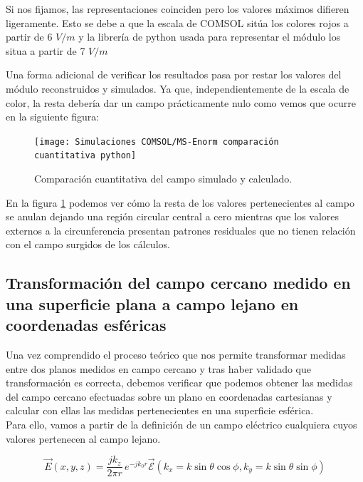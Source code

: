 \documentclass{article}
\begin{document}
Si nos fijamos, las representaciones coinciden pero los valores máximos difieren ligeramente. Esto se debe a que la escala de COMSOL sitúa los colores rojos a partir de 6 $V/m$ y la librería de python usada para representar el módulo los situa a partir de 7 $V/m$

\newpage

Una forma adicional de verificar los resultados pasa por restar los valores del módulo reconstruidos y simulados. Ya que, independientemente de la escala de color, la resta debería dar un campo prácticamente nulo como  vemos que ocurre en la siguiente figura: 

\begin{figure}[h] 
  \centering
    \texttt{[image: Simulaciones COMSOL/MS-Enorm comparación cuantitativa python]}
    \caption{Comparación cuantitativa del campo simulado y calculado.}
    \label{IFFT 2D Ex a 15mm}
\end{figure}

En la figura \ref{IFFT 2D Ex a 15mm} podemos ver cómo la resta de los valores pertenecientes al campo se anulan dejando una región circular central a cero mientras que los valores externos a la circunferencia presentan patrones residuales que no tienen relación con el campo surgidos de los cálculos.

\newpage

\subsection{Transformación del campo cercano medido en una superficie plana a campo lejano en coordenadas esféricas}
\label{sec:validación NFtoNF esférico}

Una vez comprendido el proceso teórico que nos permite transformar medidas entre dos planos medidos en campo cercano y tras haber validado que transformación es correcta, debemos verificar que podemos obtener las medidas del campo cercano efectuadas sobre un plano en coordenadas cartesianas y calcular con ellas las medidas pertenecientes en una superficie esférica.\\
Para ello, vamos a partir de la definición de un campo eléctrico cualquiera cuyos valores pertenecen al campo lejano.

\begin{equation}
\vec{E}(x,y,z)=\frac{jk_{z}}{2\pi r}\,e^{-jk_{0}r}{\vec{\mathcal{E}}}(k_{x}=k \sin\theta \cos\phi,k_{y}= k\sin\theta \sin\phi)
\label{NFtoFF:eq-campo-lejano}
\end{equation}
\end{document}
